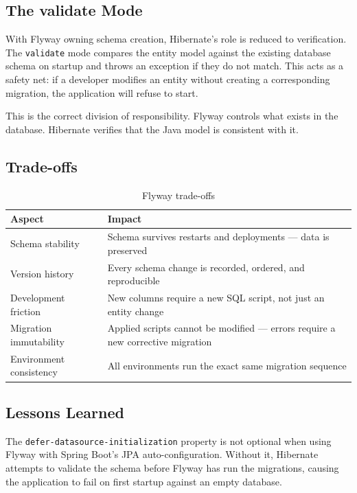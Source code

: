 \subsection{The validate Mode}

With Flyway owning schema creation, Hibernate's role is reduced to verification. The \texttt{validate} mode compares the entity model against the existing database schema on startup and throws an exception if they do not match. This acts as a safety net: if a developer modifies an entity without creating a corresponding migration, the application will refuse to start.

This is the correct division of responsibility. Flyway controls what exists in the database. Hibernate verifies that the Java model is consistent with it.

\subsection{Trade-offs}

\begin{table}[H]
\centering
\begin{tabular}{lp{9cm}}
\toprule
\textbf{Aspect} & \textbf{Impact} \\
\midrule
Schema stability & Schema survives restarts and deployments --- data is preserved \\
Version history & Every schema change is recorded, ordered, and reproducible \\
Development friction & New columns require a new SQL script, not just an entity change \\
Migration immutability & Applied scripts cannot be modified --- errors require a new corrective migration \\
Environment consistency & All environments run the exact same migration sequence \\
\bottomrule
\end{tabular}
\caption{Flyway trade-offs}
\end{table}

\subsection{Lessons Learned}

The \texttt{defer-datasource-initialization} property is not optional when using Flyway with Spring Boot's JPA auto-configuration. Without it, Hibernate attempts to validate the schema before Flyway has run the migrations, causing the application to fail on first startup against an empty database.

